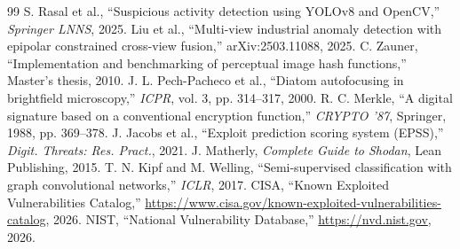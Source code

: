 \documentclass[12pt,a4paper]{article}
\begin{document}
\begin{thebibliography}{99}
 S. Rasal et al., ``Suspicious activity detection using YOLOv8 and OpenCV,'' \emph{Springer LNNS}, 2025.
 Liu et al., ``Multi-view industrial anomaly detection with epipolar constrained cross-view fusion,'' arXiv:2503.11088, 2025.
 C. Zauner, ``Implementation and benchmarking of perceptual image hash functions,'' Master's thesis, 2010.
 J. L. Pech-Pacheco et al., ``Diatom autofocusing in brightfield microscopy,'' \emph{ICPR}, vol. 3, pp. 314--317, 2000.
 R. C. Merkle, ``A digital signature based on a conventional encryption function,'' \emph{CRYPTO '87}, Springer, 1988, pp. 369--378.
 J. Jacobs et al., ``Exploit prediction scoring system (EPSS),'' \emph{Digit. Threats: Res. Pract.}, 2021.
 J. Matherly, \emph{Complete Guide to Shodan}, Lean Publishing, 2015.
 T. N. Kipf and M. Welling, ``Semi-supervised classification with graph convolutional networks,'' \emph{ICLR}, 2017.
 CISA, ``Known Exploited Vulnerabilities Catalog,'' \url{https://www.cisa.gov/known-exploited-vulnerabilities-catalog}, 2026.
 NIST, ``National Vulnerability Database,'' \url{https://nvd.nist.gov}, 2026.
\end{thebibliography}
\end{document}
